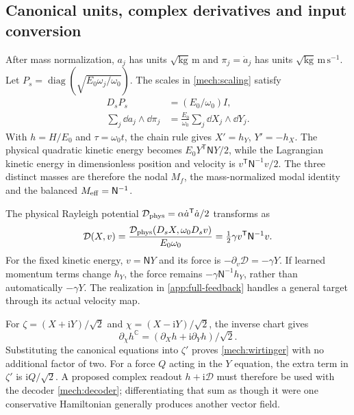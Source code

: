 \subsection{Canonical units, complex derivatives and input conversion}
\label{sm:scaling}
After mass normalization, $a_j$ has units
$\sqrt{\mathrm{kg}}\,\mathrm m$ and
$\pi_j=\dot a_j$ has units $\sqrt{\mathrm{kg}}\,\mathrm{m\,s^{-1}}$.
Let $P_s=\operatorname{diag}(\sqrt{E_0\omega_j/\omega_0})$.
The scales in \eqref{mech:scaling} satisfy
\begin{align}
 D_sP_s&=(E_0/\omega_0)I,\nonumber\\
 \sum_j\dd a_j\wedge\dd\pi_j
 &=\frac{E_0}{\omega_0}\sum_j\dd X_j\wedge\dd Y_j.
 \label{sm:scaled-form}
\end{align}
With $h=H/E_0$ and $\tau=\omega_0t$, the chain rule gives
$X'=h_Y$, $Y'=-h_X$. The physical quadratic kinetic energy becomes
$E_0Y^{\mathsf T}\mathsf NY/2$, while the Lagrangian kinetic energy
in dimensionless position and velocity is
$v^{\mathsf T}\mathsf N^{-1}v/2$.
The three distinct masses are therefore the nodal $M_f$, the
mass-normalized modal identity and the balanced
$M_{\rm eff}=\mathsf N^{-1}$.

The physical Rayleigh potential
$\mathcal D_{\rm phys}=\alpha\dot a^{\mathsf T}\dot a/2$
transforms as
\begin{equation}
 \mathcal D(X,v)=
 \frac{\mathcal D_{\rm phys}(D_sX,\omega_0D_sv)}{E_0\omega_0}
 =\tfrac12\gamma v^{\mathsf T}\mathsf N^{-1}v.
 \label{sm:rayleigh-scale}
\end{equation}
For the fixed kinetic energy, $v=\mathsf NY$ and its force is
$-\partial_v\mathcal D=-\gamma Y$. If learned momentum terms change
$h_Y$, the force remains $-\gamma\mathsf N^{-1}h_Y$, rather than
automatically $-\gamma Y$. The realization in
\eqref{app:full-feedback} handles a general target through its actual
velocity map.

For $\zeta=(X+\mathrm iY)/\sqrt2$ and
$\chi=(X-\mathrm iY)/\sqrt2$, the inverse chart gives
\begin{equation}
 \partial_\chi h^{\mathbb C}
     =(\partial_Xh+\mathrm i\partial_Yh)/\sqrt2.
 \label{sm:complex-chain-rule}
\end{equation}
Substituting the canonical equations into $\zeta'$ proves
\eqref{mech:wirtinger} with no additional factor of two.
For a force $Q$ acting in the $Y$ equation, the extra term in
$\zeta'$ is $\mathrm iQ/\sqrt2$. A proposed complex readout
$h+\mathrm i\mathcal D$ must therefore be used with the decoder
\eqref{mech:decoder}; differentiating that sum as though it were one
conservative Hamiltonian generally produces another vector field.

